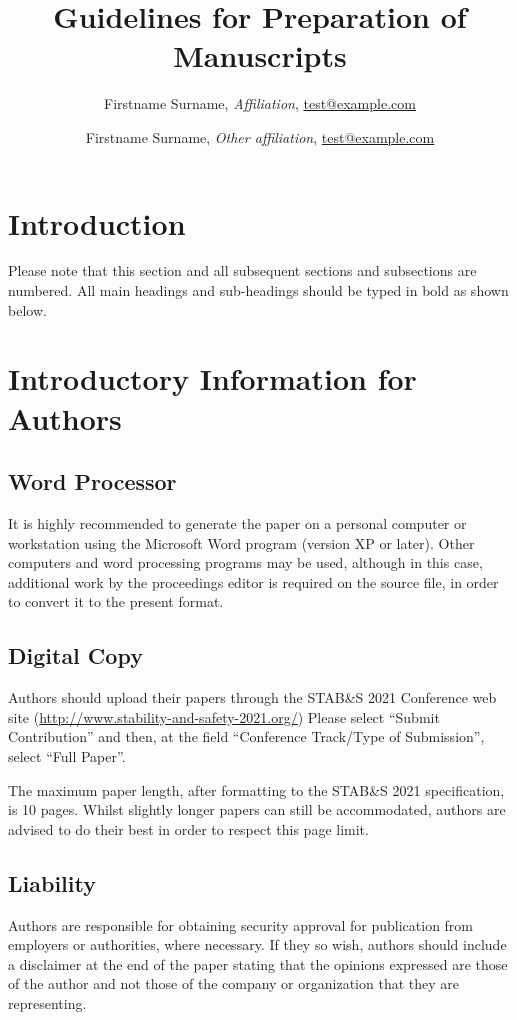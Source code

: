 \documentclass[bibtex,pagenumbers]{stabs2021}
\title{Guidelines for Preparation of Manuscripts}
\author{
  Firstname Surname, \textit{Affiliation},
  \href{mailto:test@example.com}{test@example.com}
  \and
  Firstname Surname, \textit{Other affiliation},
  \href{mailto:test@example.com}{test@example.com}
}
\begin{document}
\makestabstitle

\section{Introduction}

Please note that this section and all subsequent sections and
subsections are numbered.  All main headings and sub-headings should
be typed in bold as shown below.

\section{Introductory Information for Authors}

\subsection{Word Processor}

It is highly recommended to generate the paper on a personal computer
or workstation using the Microsoft Word program (version XP or
later). Other computers and word processing programs may be used,
although in this case, additional work by the proceedings editor is
required on the source file, in order to convert it to the present
format.

\subsection{Digital Copy}

Authors should upload their papers through the STAB\&S 2021 Conference
web site (\url{http://www.stability-and-safety-2021.org/}) Please
select ``Submit Contribution'' and then, at the field ``Conference
Track/Type of Submission'', select ``Full Paper''.

The maximum paper length, after formatting to the STAB\&S 2021
specification, is 10 pages. Whilst slightly longer papers can still be
accommodated, authors are advised to do their best in order to respect
this page limit.

\subsection{Liability}

Authors are responsible for obtaining security approval for
publication from employers or authorities, where necessary. If they so
wish, authors should include a disclaimer at the end of the paper
stating that the opinions expressed are those of the author and not
those of the company or organization that they are representing.
\end{document}
